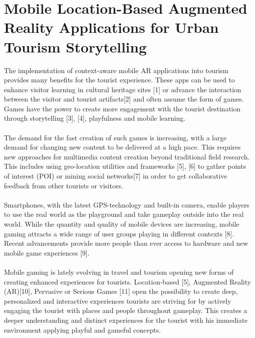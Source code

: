 \section{Mobile Location-Based Augmented Reality Applications for Urban Tourism Storytelling }

The implementation of context-aware mobile AR applications into tourism provides many beneﬁts for the tourist experience. These apps can be used to enhance visitor learning in cultural heritage sites [1] or advance the interaction between the visitor and tourist artifacts[2] and often assume the form of games. Games have the power to create more engagement with the tourist destination through storytelling [3], [4], playfulness and mobile learning.
\paragraph{}The demand for the fast creation of such games is increasing, with a large demand for changing new content to be delivered at a high pace. This requires new approaches for multimedia content creation beyond traditional ﬁeld research. This includes using geo-location utilities and frameworks [5], [6] to gather points of interest (POI) or mining social networks[7] in order to get collaborative feedback from other tourists or visitors.
\paragraph{}Smartphones, with the latest GPS-technology and built-in camera, enable players to use the real world as the playground and take gameplay outside into the real world. While the quantity and quality of mobile devices are increasing, mobile gaming attracts a wide range of user groups playing in different contexts [8]. Recent advancements provide more people than ever access to hardware and new mobile game experiences [9]. 
\paragraph{}Mobile gaming is lately evolving in travel and tourism opening new forms of creating enhanced experiences for tourists. Location-based [5], Augmented Reality (AR)[10], Pervasive or Serious Games [11] open the possibility to create deep, personalized and interactive experiences tourists are striving for by actively engaging the tourist with places and people throughout gameplay. This creates a deeper understanding and distinct experiences for the tourist with his immediate environment applying playful and gameful concepts. 

